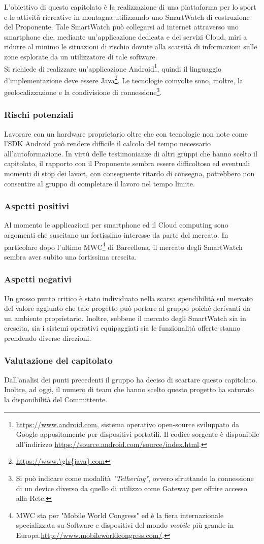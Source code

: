 L'obiettivo di questo capitolato è la realizzazione di una piattaforma per lo sport e le attività ricreative in montagna utilizzando uno SmartWatch di costruzione del Proponente. Tale SmartWatch può collegarsi ad internet attraverso uno smartphone che, mediante un'applicazione dedicata e dei servizi Cloud, miri a ridurre al minimo le situazioni di rischio dovute alla scarsità di informazioni sulle zone esplorate da un utilizzatore di tale software.\\
Si richiede di realizzare un'applicazione Android\footnote{\url{https://www.android.com}, sistema operativo open-source sviluppato da Google appositamente per dispositivi portatili. Il codice sorgente è disponibile all'indirizzo \url{https://source.android.com/source/index.html}.}, quindi il linguaggio d'implementazione deve essere \gls{Java}\footnote{\url{https://www.\gls{java}.com}}. Le tecnologie coinvolte sono, inoltre, la geolocalizzazione e la condivisione di connessione\footnote{Si può indicare come modalità \textit{"Tethering"}, ovvero sfruttando la connessione di un device diverso da quello di utilizzo come Gateway per offrire accesso alla Rete.}.
\subsubsection{Rischi potenziali}
Lavorare con un hardware proprietario oltre che con tecnologie non note come l'SDK Android può rendere difficile il calcolo del tempo necessario all’autoformazione.
In virtù delle testimonianze di altri gruppi che hanno scelto il capitolato, il rapporto con il Proponente sembra essere difficoltoso ed eventuali momenti di stop dei lavori, con conseguente ritardo di consegna, potrebbero non consentire al gruppo di completare il lavoro nel tempo limite.
\subsubsection{Aspetti positivi}
Al momento le applicazioni per smartphone ed il Cloud computing sono argomenti che suscitano un fortissimo interesse da parte del mercato. In particolare dopo l'ultimo MWC\footnote{MWC sta per "Mobile World Congress" ed è la fiera internazionale specializzata su Software e dispositivi del mondo \textit{mobile} più grande in Europa.\url{http://www.mobileworldcongress.com/}.} di Barcellona, il mercato degli SmartWatch sembra aver subito una fortissima crescita.
\subsubsection{Aspetti negativi}
Un grosso punto critico è stato individuato nella scarsa spendibilità sul mercato del valore aggiunto che tale progetto può portare al gruppo poiché derivanti da un ambiente proprietario. Inoltre, sebbene il mercato degli SmartWatch sia in crescita, sia i sistemi operativi equipaggiati sia le funzionalità offerte stanno prendendo diverse direzioni.
\subsubsection{Valutazione del capitolato}
Dall'analisi dei punti precedenti il gruppo ha deciso di scartare questo capitolato.
Inoltre, ad oggi, il numero di team che hanno scelto questo progetto ha saturato la disponibilità del Committente.

